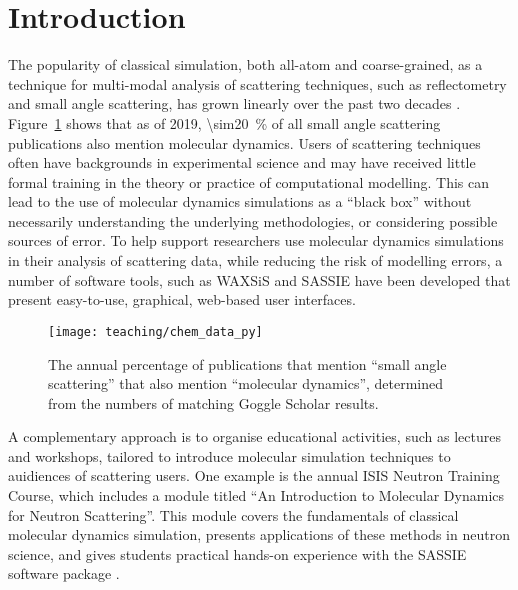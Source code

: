 \section{Introduction}
The popularity of classical simulation, both all-atom and coarse-grained, as a technique for multi-modal analysis of scattering techniques, such as reflectometry and small angle scattering, has grown linearly over the past two decades \cite{pan_molecular_2012,boldon_review_2015,hub_interpreting_2018,koutsioubas_combined_2016,darre_molecular_2015,scoppola_combining_2018}.
Figure~\ref{fig:growth} shows that as of 2019, \SI{\sim20}{\percent} of all small angle scattering publications also mention molecular dynamics.
Users of scattering techniques often have backgrounds in experimental science and may have received little formal training in the theory or practice of computational modelling.
This can lead to the use of molecular dynamics simulations as a ``black box'' without necessarily understanding the underlying methodologies, or considering possible sources of error.
To help support researchers use molecular dynamics simulations in their analysis of scattering data, while reducing the risk of modelling errors, a number of software tools, such as WAXSiS and SASSIE \cite{chen_validating_2014,knight_waxsis_2015,perkins_atomistic_2016} have been developed that present easy-to-use, graphical, web-based user interfaces.
%
\begin{figure}
    \centering
    \texttt{[image: teaching/chem\_data\_py]}
    \caption{The annual percentage of publications that mention ``small angle scattering'' that also mention ``molecular dynamics'', determined from the numbers of matching Goggle Scholar results.}
    \label{fig:growth}
\end{figure}
%

A complementary approach is to organise educational activities, such as lectures and workshops, tailored to introduce molecular simulation techniques to auidiences of scattering users.
One example is the annual ISIS Neutron Training Course, which includes a module titled ``An Introduction to Molecular Dynamics for Neutron Scattering''.
This module covers the fundamentals of classical molecular dynamics simulation, presents applications of these methods in neutron science, and gives students practical hands-on experience with the SASSIE software package \cite{perkins_atomistic_2016}.

